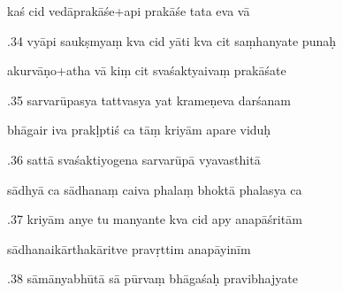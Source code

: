 \documentclass[article,12pt,a4paper]{memoir}%
\newcounter{parCount}
\begin{document}
	  
	  \pstart \leavevmode%
	kaś cid vedāprakāśe+api prakāśe tata eva vā 
	{}
	\pend%
      

	  
	  \pstart {}.34 vyāpi saukṣmyaṃ kva cid yāti kva cit saṃhanyate punaḥ 
	{}
	\pend%
      

	  
	  \pstart \leavevmode%
	akurvāṇo+atha vā kiṃ cit svaśaktyaivaṃ prakāśate 
	{}
	\pend%
      

	  
	  \pstart {}.35 sarvarūpasya tattvasya yat krameṇeva darśanam 
	{}
	\pend%
      

	  
	  \pstart \leavevmode%
	bhāgair iva prakḷptiś ca tāṃ kriyām apare viduḥ 
	{}
	\pend%
      

	  
	  \pstart {}.36 sattā svaśaktiyogena sarvarūpā vyavasthitā 
	{}
	\pend%
      

	  
	  \pstart \leavevmode%
	sādhyā ca sādhanaṃ caiva phalaṃ bhoktā phalasya ca 
	{}
	\pend%
      

	  
	  \pstart {}.37 kriyām anye tu manyante kva cid apy anapāśritām 
	{}
	\pend%
      

	  
	  \pstart \leavevmode%
	sādhanaikārthakāritve pravṛttim anapāyinīm 
	{}
	\pend%
      

	  
	  \pstart {}.38 sāmānyabhūtā sā pūrvaṃ bhāgaśaḥ pravibhajyate 
	{}
	\pend%
      
\end{document}
